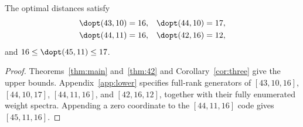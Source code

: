 \begin{corollary}\label{cor:optima}
The optimal distances satisfy
\begin{align*}
 \dopt(43,10)&=16,&\dopt(44,10)&=17,\\
 \dopt(44,11)&=16,&\dopt(42,16)&=12,
\end{align*}
and $16\le\dopt(45,11)\le17$.
\end{corollary}
\begin{proof}
Theorems~\ref{thm:main} and~\ref{thm:42} and Corollary~\ref{cor:three} give the upper bounds. Appendix~\ref{app:lower} specifies full-rank generators of $[43,10,16]$, $[44,10,17]$, $[44,11,16]$, and $[42,16,12]$, together with their fully enumerated weight spectra. Appending a zero coordinate to the $[44,11,16]$ code gives $[45,11,16]$.
\end{proof}
